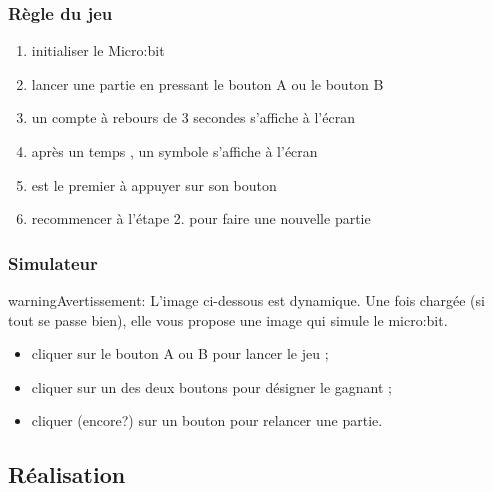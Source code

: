 \documentclass[letterpaper,10pt,french]{sphinxmanual}
\begin{document}
\subsubsection{Règle du jeu}
\label{\detokenize{projets/goFast:regle-du-jeu}}\begin{enumerate}
\item {} 
initialiser le Micro:bit

\item {} 
lancer une partie en pressant le bouton A ou le bouton B

\item {} 
un compte à rebours de 3 secondes s’affiche à l’écran

\item {} 
après un temps , un symbole s’affiche à l’écran

\item {} 
 est le premier à appuyer sur son bouton

\item {} 
recommencer à l’étape 2. pour faire une nouvelle partie

\end{enumerate}


\subsubsection{Simulateur}
\label{\detokenize{projets/goFast:simulateur}}
\begin{sphinxadmonition}{warning}{Avertissement:}
L’image ci-dessous est dynamique. Une fois chargée (si tout
se passe bien), elle vous propose une image qui simule le
micro:bit.
\begin{itemize}
\item {} 
cliquer sur le bouton A ou B pour lancer le jeu ;

\item {} 
cliquer sur un des deux boutons pour désigner le gagnant ;

\item {} 
cliquer (encore?) sur un bouton pour relancer une partie.

\end{itemize}
\end{sphinxadmonition}




\subsection{Réalisation}
\label{\detokenize{projets/goFast:realisation}}\label{\detokenize{projets/goFast-bloc-coder:gofast-bloc-coder}}
\ignorespaces 
\end{document}

